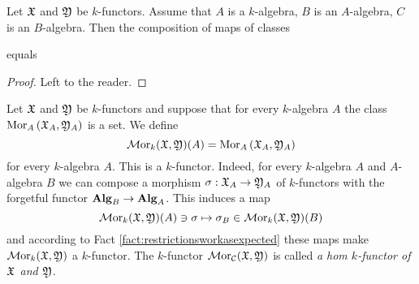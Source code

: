 \begin{fact}\label{fact:restrictionsworkasexpected}
Let ${\mathfrak X}$ and ${\mathfrak Y}$ be $k$-functors. Assume that $A$ is a $k$-algebra, $B$ is an $A$-algebra, $C$ is an $B$-algebra. Then the composition of maps of classes
\begin{center}
\end{center}
equals
\begin{center}
\end{center}
\end{fact}
\begin{proof}
Left to the reader.
\end{proof}

\begin{definition}
Let ${\mathfrak X}$ and ${\mathfrak Y}$ be $k$-functors and suppose that for every $k$-algebra $A$ the class $\mathrm{Mor}_A\left({\mathfrak X}_A,{\mathfrak Y}_A\right)$ is a set. We define
$$\mathcal{M}\mathrm{or}_k({\mathfrak X},{\mathfrak Y})(A)=\mathrm{Mor}_A\left({\mathfrak X}_A,{\mathfrak Y}_A\right)$$
for every $k$-algebra $A$. This is a $k$-functor. Indeed, for every $k$-algebra $A$ and $A$-algebra $B$ we can compose a morphism $\sigma:{\mathfrak X}_A\rightarrow {\mathfrak Y}_A$ of $k$-functors with the forgetful functor $\mathbf{Alg}_B \rightarrow \mathbf{Alg}_A$. This induces a map 
$$\mathcal{M}\mathrm{or}_{k}({\mathfrak X},{\mathfrak Y})(A)\ni \sigma \mapsto \sigma_{B}\in \mathcal{M}\mathrm{or}_{k}({\mathfrak X},{\mathfrak Y})(B)$$
and according to Fact \ref{fact:restrictionsworkasexpected} these maps make $\mathcal{M}\mathrm{or}_{k}({\mathfrak X},{\mathfrak Y})$ a $k$-functor. The $k$-functor $\mathcal{M}\mathrm{or}_{{\mathcal C}}({\mathfrak X},{\mathfrak Y})$ is called \textit{a hom $k$-functor of ${\mathfrak X}$ and ${\mathfrak Y}$}.
\end{definition}

